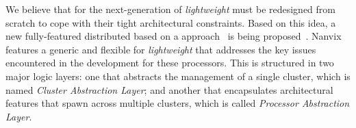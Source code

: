 



    We believe that \oses for the next-generation of \textit{lightweight} \manycores must be redesigned from scratch to cope with their tight architectural constraints. Based on this idea, a new fully-featured distributed \os based on a \multikernel approach~\cite{Baumann2009} is being proposed~\cite{penna2017-1,penna2017-2,penna2019}. Nanvix features a generic and flexible \hal for \textit{lightweight} \manycores that addresses the key issues encountered in the development for these processors. This \hal is structured in two major logic layers: one that abstracts the management of a single cluster, which is named \textit{Cluster Abstraction Layer}; and another that encapsulates architectural features that spawn across multiple clusters, which is called \textit{Processor Abstraction Layer}.

